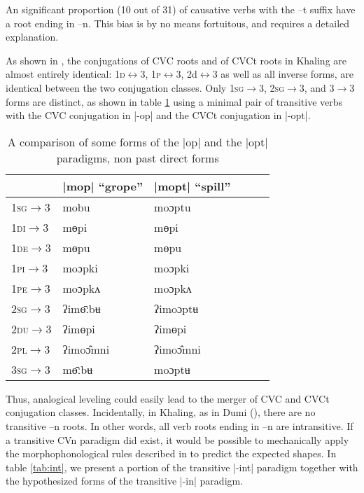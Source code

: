 \documentclass[oldfontcommands,oneside,a4paper,11pt]{article}
\newcommand{\ipa}[1]{{\phon #1}} %
\newcommand{\grise}[1]{\cellcolor{lightgray}\textbf{#1}}
\newcommand{\dhatu}[1]{|\ipa{#1}|}
\begin{document}
An significant proportion (10 out of 31) of causative verbs with the \ipa{--t} suffix have a root ending in \ipa{--n}. This bias is by no means fortuitous, and requires a detailed explanation.

As shown in \citet{jacques12khaling}, the conjugations of CVC roots and of CVCt roots in Khaling are almost entirely identical: \textsc{1d}$\longleftrightarrow$3, \textsc{1p}$\longleftrightarrow$3, 2d$\longleftrightarrow$3 as well as all inverse forms, are identical between the two conjugation classes. Only \textsc{1sg}$\rightarrow$3, \textsc{2sg}$\rightarrow$3, and 3$\rightarrow$3 forms are distinct, as shown in table \ref{tab:opt} using a minimal pair of transitive verbs with  the CVC conjugation in |-op| and the CVCt conjugation in |-opt|.

\begin{table}[h]
\caption{A comparison of some forms of the \dhatu{op} and the \dhatu{opt} paradigms, non past direct forms} \label{tab:opt} \centering
\begin{tabular}{llllll}
\toprule
\textsc{} &	\dhatu{mop} ``grope''  &  	\dhatu{mopt} ``spill''  \\  	
\midrule
\textsc{1sg$\rightarrow$3} &	\ipa{mobu}&  \grise{}  	\ipa{moɔptu}  \\  	
\textsc{1di$\rightarrow$3} &	\ipa{mɵpi}  &  	\ipa{mɵpi}  \\  	
\textsc{1de$\rightarrow$3} &	\ipa{mɵpu}  &  	\ipa{mɵpu}  \\  	
\textsc{1pi$\rightarrow$3} &	\ipa{moɔpki}  &  	\ipa{moɔpki}  \\  	
\textsc{1pe$\rightarrow$3} &	\ipa{moɔpkʌ}  &  	\ipa{moɔpkʌ}  \\  	
\textsc{2sg$\rightarrow$3} &	\ipa{ʔimɵ̄ːbʉ}  &   \grise{} 	\ipa{ʔimoɔptʉ}  \\  	
\textsc{2du$\rightarrow$3} &	\ipa{ʔimɵpi}  &  	\ipa{ʔimɵpi}  \\  	
\textsc{2pl$\rightarrow$3} &	\ipa{ʔimoɔ̂mni}  &  	\ipa{ʔimoɔ̂mni}  \\  	
\textsc{3sg$\rightarrow$3} &	\ipa{mɵ̄ːbʉ}  &  \grise{}  	\ipa{moɔptʉ}  \\  	
\bottomrule
\end{tabular}
\end{table}

Thus, analogical leveling could easily lead to the merger of CVC and CVCt conjugation classes. Incidentally, in Khaling, as in Dumi (\citealt{driem93dumi}), there are no transitive \ipa{--n} roots. In other words, all verb roots ending in \ipa{--n} are intransitive.  If a transitive CVn paradigm did exist, it would be possible to mechanically apply the morphophonological rules described in \citet{jacques12khaling} to predict the expected shapes. In table \ref{tab:int}, we present a portion of the transitive |-int| paradigm together with the hypothesized forms of the transitive |-in| paradigm.
\end{document}
